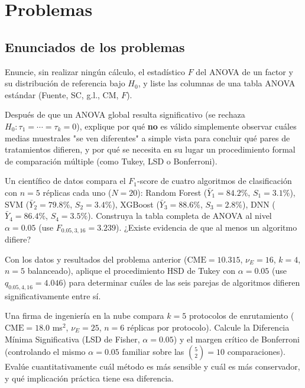 \section*{Problemas}

\subsection*{Enunciados de los problemas}

\begin{problema}
	\label{prob:83dd109}
	Enuncie, sin realizar ningún cálculo, el estadístico $F$ del ANOVA de un factor y su distribución de referencia bajo $H_0$, y liste las columnas de una tabla ANOVA estándar (Fuente, SC, g.l., CM, $F$).
\end{problema}

\begin{problema}
	\label{prob:e959af7}
	Después de que un ANOVA global resulta significativo (se rechaza $H_0:\tau_1=\cdots=\tau_k=0$), explique por qué \textbf{no} es válido simplemente observar cuáles medias muestrales "se ven diferentes" a simple vista para concluir qué pares de tratamientos difieren, y por qué se necesita en su lugar un procedimiento formal de comparación múltiple (como Tukey, LSD o Bonferroni).
\end{problema}

\begin{problema}
	\label{prob:acbf3f9}
	Un científico de datos compara el $F_1$-score de cuatro algoritmos de clasificación con $n=5$ réplicas cada uno ($N=20$): Random Forest ($\bar Y_1=84.2\%$, $S_1=3.1\%$), SVM ($\bar Y_2=79.8\%$, $S_2=3.4\%$), XGBoost ($\bar Y_3=88.6\%$, $S_3=2.8\%$), DNN ($\bar Y_4=86.4\%$, $S_4=3.5\%$). Construya la tabla completa de ANOVA al nivel $\alpha=0.05$ (use $F_{0.05,3,16}=3.239$). ¿Existe evidencia de que al menos un algoritmo difiere?
\end{problema}

\begin{problema}
	\label{prob:63c8eaa}
	Con los datos y resultados del problema anterior ($\text{CME}=10.315$, $\nu_E=16$, $k=4$, $n=5$ balanceado), aplique el procedimiento HSD de Tukey con $\alpha=0.05$ (use $q_{0.05,4,16}=4.046$) para determinar cuáles de las seis parejas de algoritmos difieren significativamente entre sí.
\end{problema}

\begin{problema}
	\label{prob:271e3ee}
	Una firma de ingeniería en la nube compara $k=5$ protocolos de enrutamiento ($\text{CME}=18.0$ ms$^2$, $\nu_E=25$, $n=6$ réplicas por protocolo). Calcule la Diferencia Mínima Significativa (LSD de Fisher, $\alpha=0.05$) y el margen crítico de Bonferroni (controlando el mismo $\alpha=0.05$ familiar sobre las $\binom{5}{2}=10$ comparaciones). Evalúe cuantitativamente cuál método es más sensible y cuál es más conservador, y qué implicación práctica tiene esa diferencia.
\end{problema}

